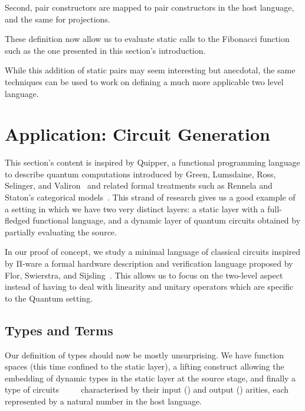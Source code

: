 Second, pair constructors are mapped to pair constructors in
the host language, and the same for projections.


These definition now allow us to evaluate static calls to the Fibonacci
function such as the one presented in this section's introduction.


While this addition of static pairs may seem interesting
but anecdotal, the same techniques can be used to work on
defining a much more applicable two level language.

\section{Application: Circuit Generation}\label{sec:circuits}

This section's content is inspired by Quipper, a functional
programming language to describe quantum computations
introduced by Green, Lumsdaine, Ross, Selinger, and
Valiron~\cite{DBLP:conf/rc/GreenLRSV13} and related
formal treatments such as Rennela and Staton's categorical
models~\cite{DBLP:journals/lmcs/RennelaS19}.
%
This strand of research gives us a good example of a setting in which
we have two very distinct layers: a static layer with a
full-fledged functional language, and a dynamic layer of
quantum circuits obtained by partially evaluating the source.

In our proof of concept, we study a minimal language of
classical circuits inspired by Π-ware a formal hardware
description and verification language proposed by
Flor, Swierstra, and Sijsling~\cite{DBLP:conf/types/FlorSS15}.
%
This allows us to focus on the two-level aspect instead of
having to deal with linearity and unitary operators which are
specific to the Quantum setting.

\subsection{Types and Terms}

Our definition of types should now be mostly unsurprising.
We have function spaces (this time confined to the static
layer), a lifting construct allowing the embedding of
dynamic types in the static layer at the source stage,
and finally a type of circuits
~~~~ characterised by
their input () and output () arities,
each represented by a natural number in the host language.

